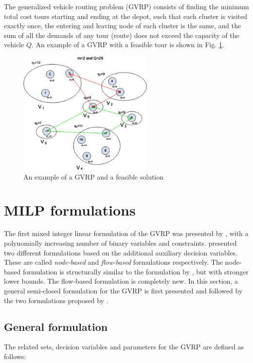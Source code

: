\documentclass[letterpaper,12pt,onehalfspacing,twoside]{article}
\theoremstyle{msds}
\begin{document}
The generalized vehicle routing problem (GVRP) consists of finding the minimum total cost tours starting and ending at the depot, such that each cluster is visited exactly once, the entering and leaving node of each cluster is the same, and the sum of all the demands of any tour (route) does not exceed the capacity of the vehicle $Q$. An example of a GVRP with a feasible tour is shown in Fig. \ref {fig:example_gvrp}.

\begin{figure}[htbp]
\centering
\includegraphics[width=0.6\textwidth]{example_gvrp.png}
\caption{An example of a GVRP and a feasible solution \citep{POP201297}}
\label{fig:example_gvrp}
\end{figure}

\section{MILP formulations}
The first mixed integer linear formulation of the GVRP was presented by \cite{bektasKara}, with a polynomially increasing number of binary variables and constraints. \cite{POP201297} presented two different formulations based on the additional auxiliary decision variables. These are called \emph{node-based} and \emph{flow-based} formulations respectively. The node-based formulation is structurally similar to the formulation by \cite{bektasKara}, but with stronger lower bounds. The flow-based formulation is completely new. In this section, a general semi-closed formulation for the GVRP is first presented and followed by the two formulations proposed by \cite{POP201297}.

\subsection{General formulation}
The related sets, decision variables and parameters for the GVRP are defined as follows:
\end{document}
